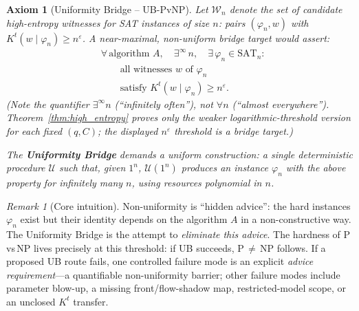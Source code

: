 \documentclass[aps,prd,twocolumn,superscriptaddress,nofootinbib]{revtex4-2}
\newtheorem{axiom}[theorem]{Axiom}
\theoremstyle{definition}
\theoremstyle{remark}
\newtheorem{remark}[theorem]{Remark}
\begin{document}
\begin{axiom}[Uniformity Bridge -- UB-PvNP]\label{ax:ub-pvnp}
Let $\mathcal{W}_n$ denote the set of candidate high-entropy witnesses for SAT instances of size $n$: pairs $(\varphi_n, w)$ with $K^t(w \mid \varphi_n) \geq n^\varepsilon$. A near-maximal, non-uniform bridge target would assert:
\[
\begin{aligned}
&\forall\, \text{algorithm } A,\quad
  \exists^\infty\, n,\quad
  \exists\, \varphi_n \in \mathrm{SAT}_n:\\
&\qquad \text{all witnesses } w \text{ of } \varphi_n\\
&\qquad \text{satisfy } K^t(w \mid \varphi_n) \geq n^\varepsilon.
\end{aligned}
\]
(Note the quantifier $\exists^\infty n$ (``infinitely often''), not $\forall n$ (``almost everywhere''). Theorem~\ref{thm:high_entropy} proves only the weaker logarithmic-threshold version for each fixed $(q,C)$; the displayed $n^\varepsilon$ threshold is a bridge target.)

The \textbf{Uniformity Bridge} demands a \emph{uniform} construction: a single deterministic procedure $\mathcal{U}$ such that, given $1^n$, $\mathcal{U}(1^n)$ produces an instance $\varphi_n$ with the above property for infinitely many $n$, using resources polynomial in $n$.
\end{axiom}

\begin{remark}[Core intuition]\label{rem:ub-intuition}
Non-uniformity is ``hidden advice'': the hard instances $\varphi_n$ exist but their identity depends on the algorithm $A$ in a non-constructive way. The Uniformity Bridge is the attempt to \emph{eliminate this advice}. The hardness of P\,vs\,NP lives precisely at this threshold: if UB succeeds, P$\,\neq\,$NP follows. If a proposed UB route fails, one controlled failure mode is an explicit \emph{advice requirement}---a quantifiable non-uniformity barrier; other failure modes include parameter blow-up, a missing front/flow-shadow map, restricted-model scope, or an unclosed $K^t$ transfer.
\end{remark}
\end{document}
